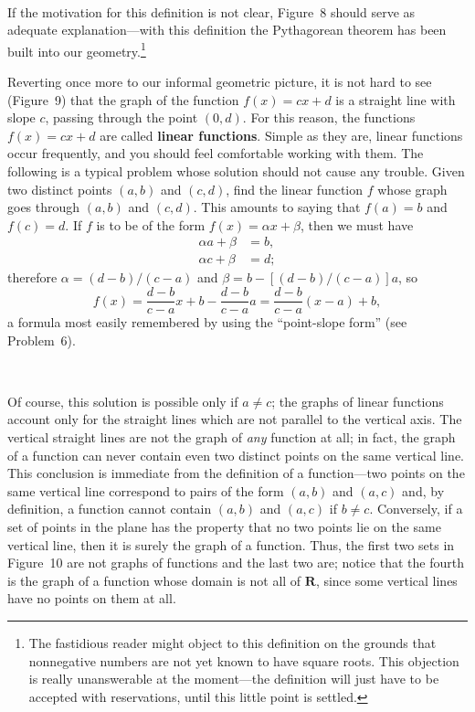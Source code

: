 \begin{center}
\\[0.6em]
\end{center}

If the motivation for this definition is not clear, Figure~8 should serve as
adequate explanation---with this definition the Pythagorean theorem has been
built into our geometry.\footnote{The fastidious reader might object to this
definition on the grounds that nonnegative numbers are not yet known to have
square roots. This objection is really unanswerable at the moment---the
definition will just have to be accepted with reservations, until this little
point is settled.}

Reverting once more to our informal geometric picture, it is not hard to see
(Figure~9) that the graph of the function $f(x)=cx+d$ is a straight line with
slope $c$, passing through the point $(0,d)$. For this reason, the functions
$f(x)=cx+d$ are called \textbf{linear functions}. Simple as they are, linear
functions occur frequently, and you should feel comfortable working with them.
The following is a typical problem whose solution should not cause any trouble.
Given two distinct points $(a,b)$ and $(c,d)$, find the linear function $f$
whose graph goes through $(a,b)$ and $(c,d)$. This amounts to saying that
$f(a)=b$ and $f(c)=d$. If $f$ is to be of the form $f(x)=\alpha x+\beta$, then
we must have
\begin{align*}
\alpha a+\beta&=b,\\
\alpha c+\beta&=d;
\end{align*}
therefore $\alpha=(d-b)/(c-a)$ and $\beta=b-[(d-b)/(c-a)]a$, so
\[
f(x)=\frac{d-b}{c-a}x+b-\frac{d-b}{c-a}a=\frac{d-b}{c-a}(x-a)+b,
\]
a formula most easily remembered by using the ``point-slope form'' (see
Problem~6).

\begin{center}
\\[0.6em]
\end{center}

Of course, this solution is possible only if $a\neq c$; the graphs of linear
functions account only for the straight lines which are not parallel to the
vertical axis. The vertical straight lines are not the graph of \emph{any}
function at all; in fact, the graph of a function can never contain even two
distinct points on the same vertical line. This conclusion is immediate from
the definition of a function---two points on the same vertical line correspond
to pairs of the form $(a,b)$ and $(a,c)$ and, by definition, a function cannot
contain $(a,b)$ and $(a,c)$ if $b\neq c$. Conversely, if a set of points in the
plane has the property that no two points lie on the same vertical line, then
it is surely the graph of a function. Thus, the first two sets in Figure~10 are
not graphs of functions and the last two are; notice that the fourth is the
graph of a function whose domain is not all of $\mathbf{R}$, since some
vertical lines have no points on them at all.

